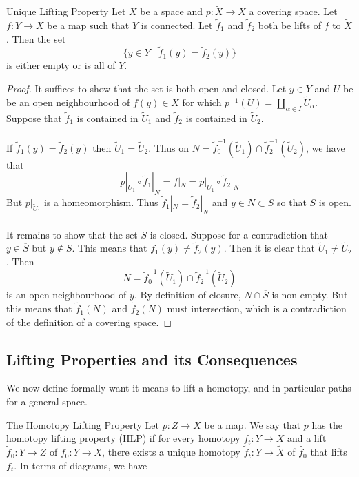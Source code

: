 \documentclass[a4paper]{article}
\begin{document}
\begin{prp}{Unique Lifting Property}{} Let $X$ be a space and $p:\tilde{X}\to X$ a covering space. Let $f:Y\to X$ be a map such that $Y$ is connected. Let $\tilde{f}_1$ and $\tilde{f}_2$ both be lifts of $f$ to $\tilde{X}$. Then the set $$\{y\in Y\;|\;\tilde{f}_1(y)=\tilde{f}_2(y)\}$$ is either empty or is all of $Y$. \tcbline
\begin{proof}
It suffices to show that the set is both open and closed. Let $y\in Y$ and $U$ be be an open neighbourhood of $f(y)\in X$ for which $p^{-1}(U)=\amalg_{\alpha\in I}\tilde{U}_\alpha$. Suppose that $\tilde{f}_1$ is contained in $\tilde{U}_1$ and $\tilde{f}_2$ is contained in $\tilde{U}_2$.  \\~\\

If $\tilde{f}_1(y)=\tilde{f}_2(y)$ then $\tilde{U}_1=\tilde{U}_2$. Thus on $N=\tilde{f}_0^{-1}(\tilde{U}_1)\cap\tilde{f}_2^{-1}(\tilde{U}_2)$, we have that $$p|_{\tilde{U}_1}\circ\tilde{f}_1|_N=f|_N=p|_{\tilde{U}_1}\circ\tilde{f}_2|_N$$ But $p|_{\tilde{U}_1}$ is a homeomorphism. Thus $\tilde{f}_1|_N=\tilde{f}_2|_N$ and $y\in N\subset S$ so that $S$ is open. \\~\\

It remains to show that the set $S$ is closed. Suppose for a contradiction that $y\in\overline{S}$ but $y\notin S$. This means that $\tilde{f}_1(y)\neq\tilde{f}_2(y)$. Then it is clear that $\tilde{U}_1\neq\tilde{U}_2$. Then $$N=\tilde{f}_0^{-1}(\tilde{U}_1)\cap\tilde{f}_2^{-1}(\tilde{U}_2)$$ is an open neighbourhood of $y$. By definition of closure, $N\cap\overline{S}$ is non-empty. But this means that $\tilde{f}_1(N)$ and $\tilde{f}_2(N)$ must intersection, which is a contradiction of the definition of a covering space. 
\end{proof}
\end{prp}

\subsection{Lifting Properties and its Consequences}
We now define formally want it means to lift a homotopy, and in particular paths for a general space. 

\begin{defn}{The Homotopy Lifting Property}{} Let $p:Z\to X$ be a map. We say that $p$ has the homotopy lifting property (HLP) if for every homotopy $f_t:Y\to X$ and a lift $\tilde{f}_0:Y\to Z$ of $f_0:Y\to X$, there exists a unique homotopy $\tilde{f}_t:Y\to\tilde{X}$ of $\tilde{f_0}$ that lifts $f_t$. In terms of diagrams, we have \\~\\
\end{defn}
\end{document}
